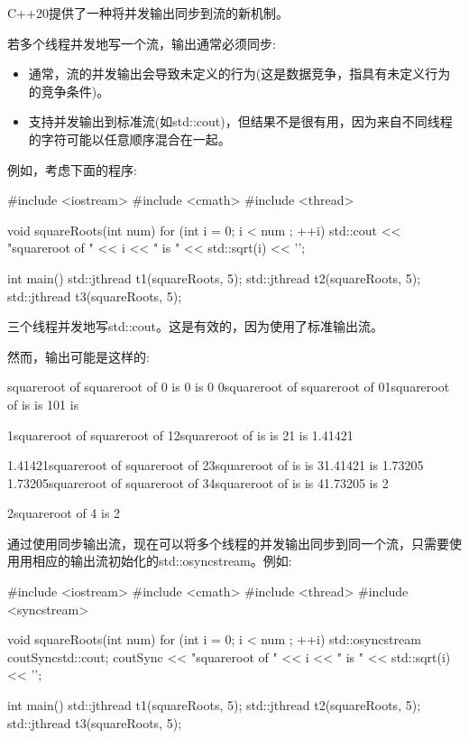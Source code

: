 

C++20提供了一种将并发输出同步到流的新机制。


若多个线程并发地写一个流，输出通常必须同步:

\begin{itemize}
\item 
通常，流的并发输出会导致未定义的行为(这是数据竞争，指具有未定义行为的竞争条件)。

\item 
支持并发输出到标准流(如std::cout)，但结果不是很有用，因为来自不同线程的字符可能以任意顺序混合在一起。
\end{itemize}

例如，考虑下面的程序:


\begin{cpp}
#include <iostream>
#include <cmath>
#include <thread>

void squareRoots(int num)
{
	for (int i = 0; i < num ; ++i) {
		std::cout << "squareroot of " << i << " is "
		<< std::sqrt(i) << '\n';
	}
}

int main()
{
	std::jthread t1(squareRoots, 5);
	std::jthread t2(squareRoots, 5);
	std::jthread t3(squareRoots, 5);
}	
\end{cpp}

三个线程并发地写std::cout。这是有效的，因为使用了标准输出流。

然而，输出可能是这样的:

\begin{shell}
squareroot of squareroot of 0 is 0 is 0
0squareroot of squareroot of
01squareroot of is is 101 is

1squareroot of squareroot of
12squareroot of is is 21 is 1.41421

1.41421squareroot of squareroot of
23squareroot of is is 31.41421 is 1.73205
1.73205squareroot of squareroot of
34squareroot of is is 41.73205 is 2

2squareroot of
4 is 2
\end{shell}


通过使用同步输出流，现在可以将多个线程的并发输出同步到同一个流，只需要使用用相应的输出流初始化的std::osyncstream。例如:


\begin{cpp}
#include <iostream>
#include <cmath>
#include <thread>
#include <syncstream>

void squareRoots(int num)
{
	for (int i = 0; i < num ; ++i) {
		std::osyncstream coutSync{std::cout};
		coutSync << "squareroot of " << i << " is "
		<< std::sqrt(i) << '\n';
	}
}

int main()
{
	std::jthread t1(squareRoots, 5);
	std::jthread t2(squareRoots, 5);
	std::jthread t3(squareRoots, 5);
}
\end{cpp}

